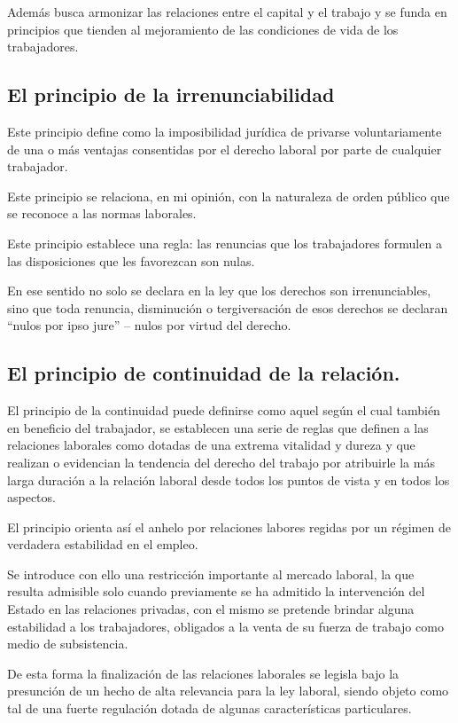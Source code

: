 \documentclass[a4paper]{article}
\begin{document}
Además busca armonizar las relaciones entre el capital y el trabajo y se funda en principios que tienden al mejoramiento de las condiciones de vida de los trabajadores. 

\subsection{El principio de la irrenunciabilidad}
Este principio define como la imposibilidad jurídica de privarse voluntariamente de una o más ventajas consentidas por el derecho laboral por parte de cualquier trabajador. 

Este principio se relaciona, en mi opinión, con la naturaleza de orden público que se reconoce a las normas laborales. 

Este principio establece una regla: las renuncias que los trabajadores formulen a las disposiciones que les favorezcan son nulas.

En ese sentido no solo se declara en la ley que los derechos son irrenunciables, sino que toda renuncia, disminución o tergiversación de esos derechos se declaran “nulos por ipso jure” – nulos por virtud del derecho.

\subsection{El principio de continuidad de la relación.}

El principio de la continuidad puede definirse como aquel según el cual también en beneficio del trabajador, se establecen una serie de reglas que definen a las relaciones laborales como dotadas de una extrema vitalidad y dureza y que realizan o evidencian la tendencia del derecho del trabajo por atribuirle la más larga duración a la relación laboral desde todos los puntos de vista y en todos los aspectos. 

El principio orienta así el anhelo por relaciones labores regidas por un régimen de verdadera estabilidad en el empleo. 

Se introduce con ello una restricción importante al mercado laboral, la que resulta admisible solo cuando previamente se ha admitido la intervención del Estado en las relaciones privadas, con el mismo se pretende brindar alguna estabilidad a los trabajadores, obligados a la venta de su fuerza de trabajo como medio de subsistencia. 

De esta forma la finalización de las relaciones laborales se legisla bajo la presunción de un hecho de alta relevancia para la ley laboral, siendo objeto como tal de una fuerte regulación dotada de algunas características particulares. 
\end{document}
